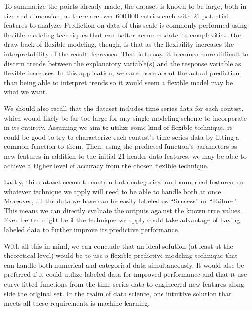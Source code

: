 To summarize the points already made, the dataset is known to be large, both in size and dimension, as there are over 600,000 entries each with 21 potential features to analyze. Prediction on data of this scale is commonly performed using flexible modeling techniques that can better accommodate its complexities. One draw-back of flexible modeling, though, is that as the flexibility increases the interpretability of the result decreases. That is to say, it becomes more difficult to discern trends between the explanatory variable(s) and the response variable as flexible increases. In this application, we care more about the actual prediction than being able to interpret trends so it would seem a flexible model may be what we want.

We should also recall that the dataset includes time series data for each contest, which would likely be far too large for any single modeling scheme to incorporate in its entirety. Assuming we aim to utilize some kind of flexible technique, it could be good to try to characterize each contest's time series data by fitting a common function to them. Then, using the predicted function's parameters as new features in addition to the initial 21 header data features, we may be able to achieve a higher level of accuracy from the chosen flexible technique.

Lastly, this dataset seems to contain both categorical and numerical features, so whatever technique we apply will need to be able to handle both at once. Moreover, all the data we have can be easily labeled as ``Success'' or ``Failure''. This means we can directly evaluate the outputs against the known true values. Even better might be if the technique we apply could take advantage of having labeled data to further improve its predictive performance.

With all this in mind, we can conclude that an ideal solution (at least at the theoretical level) would be to use a flexible predictive modeling technique that can handle both numerical and categorical data simultaneously. It would also be preferred if it could utilize labeled data for improved performance and that it use curve fitted functions from the time series data to engineered new features along side the original set. In the realm of data science, one intuitive solution that meets all these requirements is machine learning. 




